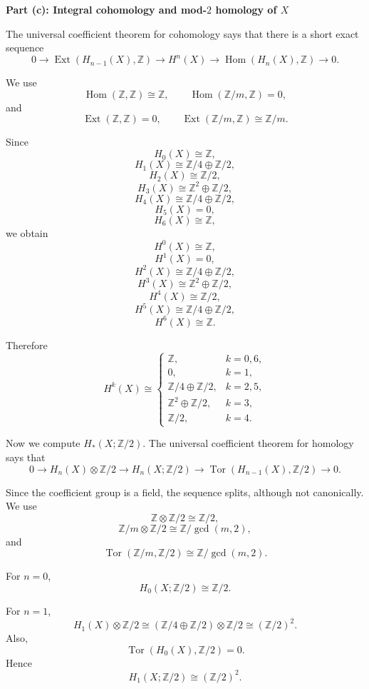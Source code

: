 \begin{solution}
\medskip
\noindent\textbf{Part (c): Integral cohomology and mod-\(2\) homology of \(X\)}\par
\smallskip


The universal coefficient theorem for cohomology says that there is a short exact sequence
\[
0
\longrightarrow
\operatorname{Ext}(H_{n-1}(X),\mathbb Z)
\longrightarrow
H^n(X)
\longrightarrow
\operatorname{Hom}(H_n(X),\mathbb Z)
\longrightarrow
0.
\]

We use
\[
\operatorname{Hom}(\mathbb Z,\mathbb Z)\cong \mathbb Z,
\qquad
\operatorname{Hom}(\mathbb Z/m,\mathbb Z)=0,
\]
and
\[
\operatorname{Ext}(\mathbb Z,\mathbb Z)=0,
\qquad
\operatorname{Ext}(\mathbb Z/m,\mathbb Z)\cong \mathbb Z/m.
\]

Since
\[
H_0(X)\cong \mathbb Z,
\]
\[
H_1(X)\cong \mathbb Z/4\oplus \mathbb Z/2,
\]
\[
H_2(X)\cong \mathbb Z/2,
\]
\[
H_3(X)\cong \mathbb Z^2\oplus \mathbb Z/2,
\]
\[
H_4(X)\cong \mathbb Z/4\oplus \mathbb Z/2,
\]
\[
H_5(X)=0,
\]
\[
H_6(X)\cong \mathbb Z,
\]
we obtain
\[
H^0(X)\cong \mathbb Z,
\]
\[
H^1(X)=0,
\]
\[
H^2(X)\cong \mathbb Z/4\oplus \mathbb Z/2,
\]
\[
H^3(X)\cong \mathbb Z^2\oplus \mathbb Z/2,
\]
\[
H^4(X)\cong \mathbb Z/2,
\]
\[
H^5(X)\cong \mathbb Z/4\oplus \mathbb Z/2,
\]
\[
H^6(X)\cong \mathbb Z.
\]

Therefore
\[
\boxed{
	H^k(X)\cong
	\begin{cases}
		\mathbb Z, & k=0,6,\\[1mm]
		0, & k=1,\\[1mm]
		\mathbb Z/4\oplus \mathbb Z/2, & k=2,5,\\[1mm]
		\mathbb Z^2\oplus \mathbb Z/2, & k=3,\\[1mm]
		\mathbb Z/2, & k=4.
\end{cases}}
\]

Now we compute \(H_*(X;\mathbb Z/2)\). The universal coefficient theorem for homology says that
\[
0
\longrightarrow
H_n(X)\otimes \mathbb Z/2
\longrightarrow
H_n(X;\mathbb Z/2)
\longrightarrow
\operatorname{Tor}(H_{n-1}(X),\mathbb Z/2)
\longrightarrow
0.
\]

Since the coefficient group is a field, the sequence splits, although not canonically. We use
\[
\mathbb Z\otimes \mathbb Z/2\cong \mathbb Z/2,
\]
\[
\mathbb Z/m\otimes \mathbb Z/2
\cong
\mathbb Z/\gcd(m,2),
\]
and
\[
\operatorname{Tor}(\mathbb Z/m,\mathbb Z/2)
\cong
\mathbb Z/\gcd(m,2).
\]

For \(n=0\),
\[
H_0(X;\mathbb Z/2)\cong \mathbb Z/2.
\]

For \(n=1\),
\[
H_1(X)\otimes \mathbb Z/2
\cong
(\mathbb Z/4\oplus \mathbb Z/2)\otimes \mathbb Z/2
\cong
(\mathbb Z/2)^2.
\]
Also,
\[
\operatorname{Tor}(H_0(X),\mathbb Z/2)=0.
\]
Hence
\[
H_1(X;\mathbb Z/2)\cong (\mathbb Z/2)^2.
\]


\end{solution}

